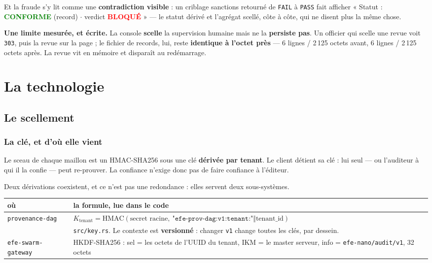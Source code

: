 \documentclass[10pt]{report}
\newcommand{\code}[1]{\texttt{\small #1}}
\newcommand{\ok}[1]{\textcolor{green}{\textbf{#1}}}
\newcommand{\ko}[1]{\textcolor{red}{\textbf{#1}}}
\newcommand{\att}[1]{\textcolor{amber}{\textbf{#1}}}
\begin{document}
Et la fraude s'y lit comme une \textbf{contradiction visible} : un criblage sanctions retourné de
\code{FAIL} à \code{PASS} fait afficher « Statut : \ok{CONFORME} (record) $\cdot$ verdict
\ko{BLOQUÉ} » --- le statut dérivé et l'agrégat scellé, côte à côte, qui ne disent plus la même
chose.

\att{Une limite mesurée, et écrite.} La console \textbf{scelle} la supervision humaine mais ne la
\textbf{persiste pas}. Un officier qui scelle une revue voit \code{303}, puis la revue sur la page ;
le fichier de records, lui, reste \textbf{identique à l'octet près} --- 6 lignes / 2\,125 octets
avant, 6 lignes / 2\,125 octets après. La revue vit en mémoire et disparaît au redémarrage.


\chapter{La technologie}

\section{Le scellement}

\subsection{La clé, et d'où elle vient}

Le sceau de chaque maillon est un HMAC-SHA256 sous une clé \textbf{dérivée par tenant}. Le client
détient sa clé : lui seul --- ou l'auditeur à qui il la confie --- peut re-prouver. La confiance
n'exige donc pas de faire confiance à l'éditeur.

Deux dérivations coexistent, et ce n'est pas une redondance : elles servent deux sous-systèmes.

\begin{longtable}{@{}p{3.8cm} p{11.2cm}@{}}
\toprule \textbf{où} & \textbf{la formule, lue dans le code} \\ \midrule \endhead
\code{provenance-dag} & $K_{\text{tenant}} = \mathrm{HMAC}(\text{secret racine},\ \texttt{"efe-prov-dag:v1:tenant:"} \Vert \text{tenant\_id})$ \\
& \footnotesize\code{src/key.rs}. Le contexte est \textbf{versionné} : changer \code{v1} change toutes les clés, par dessein. \\
\code{efe-swarm-gateway} & HKDF-SHA256 : sel = les octets de l'UUID du tenant, IKM = le master serveur, info = \code{efe-nano/audit/v1}, 32 octets \\
\bottomrule
\end{longtable}
\end{document}
